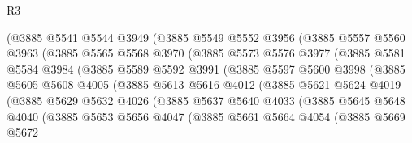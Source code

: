 \begin{lexlean}{R3}
\begin{coremodule}
                (@3885
                  @5541
                  @5544
                  @3949
                  (@3885
                    @5549
                    @5552
                    @3956
                    (@3885
                      @5557
                      @5560
                      @3963
                      (@3885
                        @5565
                        @5568
                        @3970
                        (@3885
                          @5573
                          @5576
                          @3977
                          (@3885
                            @5581
                            @5584
                            @3984
                            (@3885
                              @5589
                              @5592
                              @3991
                              (@3885
                                @5597
                                @5600
                                @3998
                                (@3885
                                  @5605
                                  @5608
                                  @4005
                                  (@3885
                                    @5613
                                    @5616
                                    @4012
                                    (@3885
                                      @5621
                                      @5624
                                      @4019
                                      (@3885
                                        @5629
                                        @5632
                                        @4026
                                        (@3885
                                          @5637
                                          @5640
                                          @4033
                                          (@3885
                                            @5645
                                            @5648
                                            @4040
                                            (@3885
                                              @5653
                                              @5656
                                              @4047
                                              (@3885
                                                @5661
                                                @5664
                                                @4054
                                                (@3885
                                                  @5669
                                                  @5672

\end{coremodule}
\end{lexlean}
